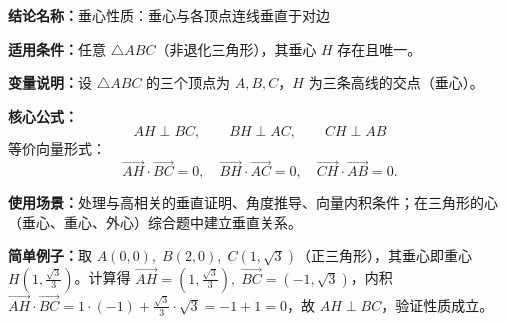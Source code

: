 \textbf{结论名称：}垂心性质：垂心与各顶点连线垂直于对边

\textbf{适用条件：}任意 $\triangle ABC$（非退化三角形），其垂心 $H$ 存在且唯一。

\textbf{变量说明：}设 $\triangle ABC$ 的三个顶点为 $A,B,C$，$H$ 为三条高线的交点（垂心）。

\textbf{核心公式：}
\[
\boxed{AH\perp BC,\qquad BH\perp AC,\qquad CH\perp AB}
\]
等价向量形式：
\[
\overrightarrow{AH}\cdot\overrightarrow{BC}=0,\quad \overrightarrow{BH}\cdot\overrightarrow{AC}=0,\quad \overrightarrow{CH}\cdot\overrightarrow{AB}=0.
\]

\textbf{使用场景：}处理与高相关的垂直证明、角度推导、向量内积条件；在三角形的心（垂心、重心、外心）综合题中建立垂直关系。

\textbf{简单例子：}取 $A(0,0),\;B(2,0),\;C(1,\sqrt{3})$（正三角形），其垂心即重心 $H(1,\frac{\sqrt{3}}{3})$。计算得
$\overrightarrow{AH}=(1,\frac{\sqrt{3}}{3}),\;\overrightarrow{BC}=(-1,\sqrt{3})$，内积
$\overrightarrow{AH}\cdot\overrightarrow{BC}=1\cdot(-1)+\frac{\sqrt{3}}{3}\cdot\sqrt{3}=-1+1=0$，故 $AH\perp BC$，验证性质成立。